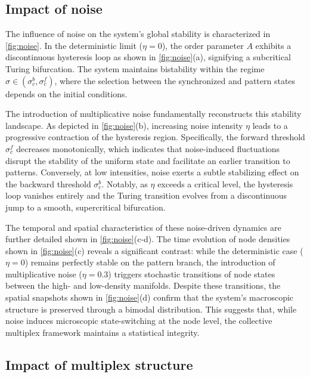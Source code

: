 \documentclass{SCIS2026}
\begin{document}
\subsection{Impact of noise}

The influence of noise on the system's global stability is characterized in \cref{fig:noise}.
In the deterministic limit ($\eta = 0$), the order parameter $A$ exhibits a discontinuous hysteresis loop as shown in \cref{fig:noise}(a), signifying a subcritical Turing bifurcation.
The system maintains bistability within the regime $\sigma \in (\sigma_c^b, \sigma_c^f)$, where the selection between the synchronized and pattern states depends on the initial conditions.

The introduction of multiplicative noise fundamentally reconstructs this stability landscape.
As depicted in \cref{fig:noise}(b), increasing noise intensity $\eta$ leads to a progressive contraction of the hysteresis region.
Specifically, the forward threshold $\sigma_c^f$ decreases monotonically, which indicates that noise-induced fluctuations disrupt the stability of the uniform state and facilitate an earlier transition to patterns.
Conversely, at low intensities, noise exerts a subtle stabilizing effect on the backward threshold $\sigma_c^b$.
Notably, as $\eta$ exceeds a critical level, the hysteresis loop vanishes entirely and the Turing transition evolves from a discontinuous jump to a smooth, supercritical bifurcation.

The temporal and spatial characteristics of these noise-driven dynamics are further detailed shown in \cref{fig:noise}(c-d).
The time evolution of node densities shown in \cref{fig:noise}(c) reveals a significant contrast: while the deterministic case ($\eta=0$) remains perfectly stable on the pattern branch, the introduction of multiplicative noise ($\eta=0.3$) triggers stochastic transitions of node states between the high- and low-density manifolds.
Despite these transitions, the spatial snapshots shown in \cref{fig:noise}(d) confirm that the system's macroscopic structure is preserved through a bimodal distribution.
This suggests that, while noise induces microscopic state-switching at the node level, the collective multiplex framework maintains a statistical integrity.

\subsection{Impact of multiplex structure}
\end{document}
